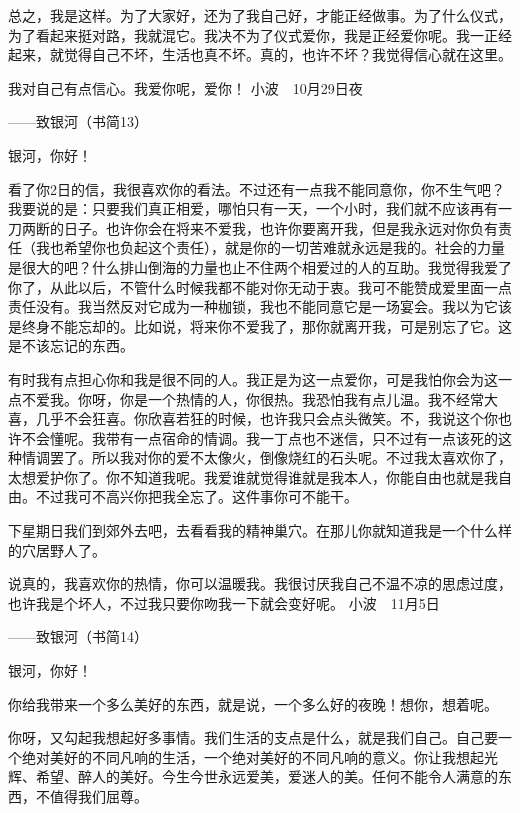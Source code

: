 总之，我是这样。为了大家好，还为了我自己好，才能正经做事。为了什么仪式，为了看起来挺对路，我就混它。我决不为了仪式爱你，我是正经爱你呢。我一正经起来，就觉得自己不坏，生活也真不坏。真的，也许不坏？我觉得信心就在这里。 

我对自己有点信心。我爱你呢，爱你！ 小波　10月29日夜 







——致银河（书简13） 

银河，你好！ 

看了你2日的信，我很喜欢你的看法。不过还有一点我不能同意你，你不生气吧？我要说的是：只要我们真正相爱，哪怕只有一天，一个小时，我们就不应该再有一刀两断的日子。也许你会在将来不爱我，也许你要离开我，但是我永远对你负有责任（我也希望你也负起这个责任），就是你的一切苦难就永远是我的。社会的力量是很大的吧？什么排山倒海的力量也止不住两个相爱过的人的互助。我觉得我爱了你了，从此以后，不管什么时候我都不能对你无动于衷。我可不能赞成爱里面一点责任没有。我当然反对它成为一种枷锁，我也不能同意它是一场宴会。我以为它该是终身不能忘却的。比如说，将来你不爱我了，那你就离开我，可是别忘了它。这是不该忘记的东西。 

有时我有点担心你和我是很不同的人。我正是为这一点爱你，可是我怕你会为这一点不爱我。你呀，你是一个热情的人，你很热。我恐怕我有点儿温。我不经常大喜，几乎不会狂喜。你欣喜若狂的时候，也许我只会点头微笑。不，我说这个你也许不会懂呢。我带有一点宿命的情调。我一丁点也不迷信，只不过有一点该死的这种情调罢了。所以我对你的爱不太像火，倒像烧红的石头呢。不过我太喜欢你了，太想爱护你了。你不知道我呢。我爱谁就觉得谁就是我本人，你能自由也就是我自由。不过我可不高兴你把我全忘了。这件事你可不能干。 

下星期日我们到郊外去吧，去看看我的精神巢穴。在那儿你就知道我是一个什么样的穴居野人了。 

说真的，我喜欢你的热情，你可以温暖我。我很讨厌我自己不温不凉的思虑过度，也许我是个坏人，不过我只要你吻我一下就会变好呢。 小波　11月5日 







——致银河（书简14） 

银河，你好！ 

你给我带来一个多么美好的东西，就是说，一个多么好的夜晚！想你，想着呢。 

你呀，又勾起我想起好多事情。我们生活的支点是什么，就是我们自己。自己要一个绝对美好的不同凡响的生活，一个绝对美好的不同凡响的意义。你让我想起光辉、希望、醉人的美好。今生今世永远爱美，爱迷人的美。任何不能令人满意的东西，不值得我们屈尊。 

